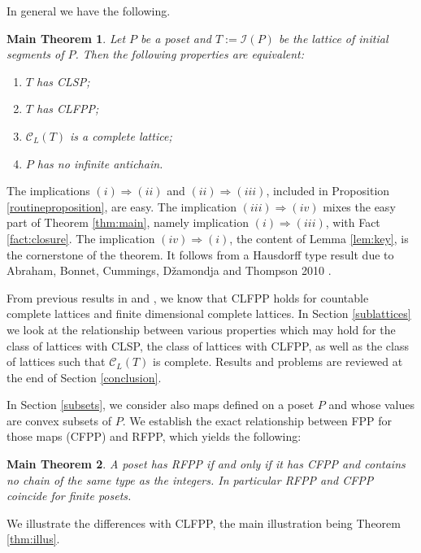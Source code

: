 \documentclass[12pt]{amsart}
\newtheorem{maintheorem}{{\bf Main Theorem}}
\begin{document}
\medskip

In general we have the following.

\begin{maintheorem}\label{thm:main2}
Let $P$ be a poset and $T:=\mathcal{I}(P)$ be the lattice of initial
segments of $P$. Then the following properties are equivalent:
\begin{enumerate}[{(i)}]
 \item $T$ has  CLSP;
 \item $T$ has  CLFPP;
 \item $\mathcal{C}_{ L}(T)$ is a complete lattice;
\item $P$ has no infinite antichain.
\end{enumerate}
\end{maintheorem}

The implications $(i)\Rightarrow (ii)$ and $(ii)\Rightarrow (iii)$,
included in Proposition \ref{routineproposition}, are
easy. The implication $(iii)\Rightarrow (iv)$ mixes the easy part of
Theorem \ref{thm:main}, namely implication $(i)\Rightarrow (iii)$,
with Fact \ref{fact:closure}. The implication $(iv)\Rightarrow (i)$, the
content of Lemma \ref {lem:key}, is the cornerstone of the theorem.
It follows from a Hausdorff type result due to Abraham, Bonnet,
Cummings, D\v{z}amondja and Thompson 2010 \cite{abraham-all}.

From previous results in \cite{D-R-S} and \cite{pou-riv84}, we know
that CLFPP holds for countable complete lattices and finite
dimensional complete lattices.  In Section \ref{sublattices} we look
at the relationship between various properties which may hold for the
class of lattices with  CLSP, the class of lattices with CLFPP,
as well as the class of lattices such that $\mathcal{C}_{L}(T)$ is
complete. Results and problems are reviewed at the end of Section
\ref{conclusion}.

In Section \ref{subsets}, we consider also maps defined on a poset $P$
and whose values are convex subsets of $P$. We establish the exact
relationship between FPP for those maps (CFPP) and RFPP, which yields the following:

\begin{maintheorem}\label{RFPP}
A poset has RFPP if and only if it has CFPP and contains no chain of
the same type as the integers. In particular RFPP and CFPP coincide for finite posets.
\end{maintheorem}

We illustrate the differences with CLFPP, the main illustration
being Theorem \ref{thm:illus}.
\end{document}
